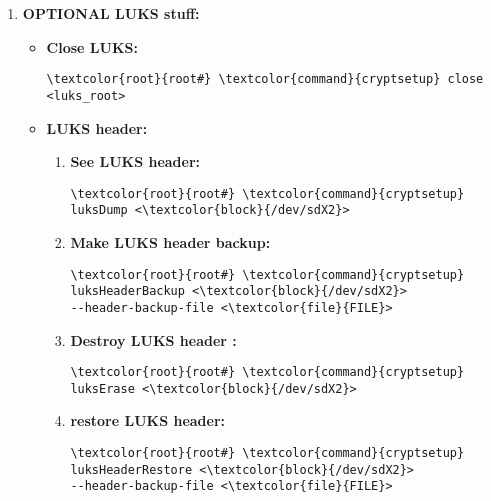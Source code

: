 \documentclass[10pt, a4paper, onecolumn, openany]{book} %
\begin{document}
\begin{enumerate}
    \item \textbf{OPTIONAL LUKS stuff:}
    \begin{itemize}
        \item \textbf{Close LUKS:}
\begin{Verbatim}[commandchars=\\\{\}]
\textcolor{root}{root#} \textcolor{command}{cryptsetup} close <luks_root>
\end{Verbatim}
\item \textbf{LUKS header:}
        \begin{enumerate}
            \item \textbf{See LUKS header:}
\begin{Verbatim}[commandchars=\\\{\}]
\textcolor{root}{root#} \textcolor{command}{cryptsetup} luksDump <\textcolor{block}{/dev/sdX2}>
\end{Verbatim}
            \item \textbf{Make LUKS header backup:}
\begin{Verbatim}[commandchars=\\\{\}]
\textcolor{root}{root#} \textcolor{command}{cryptsetup} luksHeaderBackup <\textcolor{block}{/dev/sdX2}>
--header-backup-file <\textcolor{file}{FILE}>
\end{Verbatim}
            \item \textbf{Destroy LUKS header :}
\begin{Verbatim}[commandchars=\\\{\}]
\textcolor{root}{root#} \textcolor{command}{cryptsetup} luksErase <\textcolor{block}{/dev/sdX2}>
\end{Verbatim}
            \item \textbf{restore LUKS header:}
\begin{Verbatim}[commandchars=\\\{\}]
\textcolor{root}{root#} \textcolor{command}{cryptsetup} luksHeaderRestore <\textcolor{block}{/dev/sdX2}> 
--header-backup-file <\textcolor{file}{FILE}>
\end{Verbatim}
        \end{enumerate}
    \end{itemize}

\end{enumerate}
\end{document}
